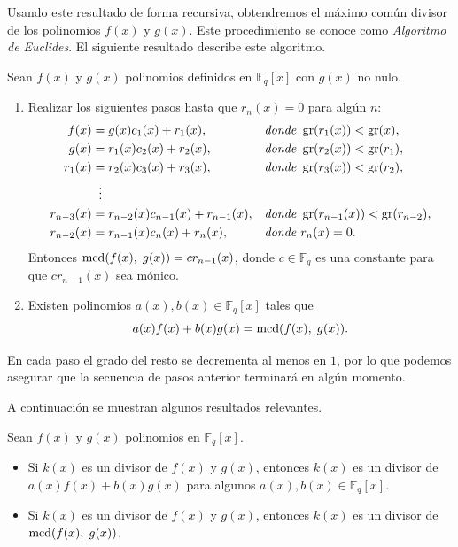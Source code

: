 Usando este resultado de forma recursiva, obtendremos el máximo común divisor de los polinomios $f(x)$ y $g(x)$. Este procedimiento se conoce como \emph{Algoritmo de Euclides}. El siguiente resultado describe este algoritmo.

\begin{theorem}
    \label{th:alg-euclides}
    Sean $f(x)$ y $g(x)$ polinomios definidos en $\mathbb{F}_q[x]$ con $g(x)$ no nulo.
    \begin{enumerate}
        \item Realizar los siguientes pasos hasta que $r_n(x) = 0$ para algún $n$:
            \begin{align*}
                f(x)        &= g(x) c_1(x) + r_1(x), & &\textit{donde } \operatorname{gr}(r_1(x)) < \operatorname{gr}(x),\\
                g(x)        &= r_1(x) c_2(x) + r_2(x),& &\textit{donde } \operatorname{gr}(r_2(x)) < \operatorname{gr}(r_1),\\
                r_1(x)      &= r_2(x) c_3(x) + r_3(x),& &\textit{donde } \operatorname{gr}(r_3(x)) < \operatorname{gr}(r_2),\\
                            &\; \; \vdots & &\\
                r_{n-3}(x)  &= r_{n-2}(x) c_{n-1}(x) + r_{n-1}(x),& &\textit{donde } \operatorname{gr}(r_{n-1}(x)) < \operatorname{gr}(r_{n-2}),\\
                r_{n-2}(x)  &= r_{n-1}(x) c_{n}(x) + r_{n}(x),& &\textit{donde } r_n(x) = 0.
            \end{align*}
            Entonces $\operatorname{mcd}(f(x), \; g(x)) = cr_{n-1}(x)$, donde $c \in \mathbb{F}_q$ es una constante para que $c r_{n-1}(x)$ sea mónico.
        \item Existen polinomios $a(x), b(x) \in \mathbb{F}_q[x]$ tales que 
        $$a(x) f(x) + b(x) g(x) = \operatorname{mcd}(f(x), \; g(x)).$$
    \end{enumerate}
\end{theorem}

En cada paso el grado del resto se decrementa al menos en $1$, por lo que podemos asegurar que la secuencia de pasos anterior terminará en algún momento.

A continuación se muestran algunos resultados relevantes.

\begin{proposition}
    Sean $f(x)$ y $g(x)$ polinomios en $\mathbb{F}_q[x]$.
    \begin{itemize}
        \item Si $k(x)$ es un divisor de $f(x)$ y $g(x)$, entonces $k(x)$ es un divisor de $a(x) f(x) + b(x) g(x)$ para algunos $a(x), b(x) \in \mathbb{F}_q[x]$.
        \item Si $k(x)$ es un divisor de $f(x)$ y $g(x)$, entonces $k(x)$ es un divisor de $\operatorname{mcd}(f(x), \; g(x))$.
    \end{itemize}
\end{proposition}

